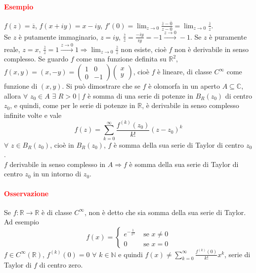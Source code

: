 \documentclass{article}
\newcommand{\R}{\mathbb{R}}
\newcommand{\C}{\mathbb{C}}
\newcommand{\N}{\mathbb{N}}
\begin{document}
\paragraph{\textcolor{red}{Esempio}}
$f(z)=\overline{z}$, $f(x+iy)=x-iy$, $f'(0)=\lim_{z \rightarrow 0} \frac{\overline{z}-\overline{0}}{z-0}=\lim_{z\rightarrow0}\frac{\overline{z}}{z}$.\\
Se $z$ è putamente immaginario, $z=iy$, $\frac{\overline{z}}{z}=\frac{-iy}{iy}=-1\xrightarrow{z \rightarrow 0}-1$. Se $z$ è puramente reale, $z=x$, $\frac{\overline{z}}{z}=1\xrightarrow{z \rightarrow 0}1 \Rightarrow \lim_{z\rightarrow0}\frac{\overline{z}}{z}$ non esiste, cioè $f$ non è derivabile in senso complesso. Se guardo $f$ come una funzione definita su $\R^2$, $f(x,y)=(x,-y)=\begin{pmatrix}
1 & 0 \\
0 & -1 
\end{pmatrix} \begin{pmatrix}
x\\
y
\end{pmatrix}$, cioè $f$ è lineare, di classe $C^\infty$ come funzione di $(x,y)$.
Si può dimostrare che se $f$ è olomorfa in un aperto $A\subseteq \C$, allora $\forall\,\, z_0 \in A \,\,\exists\,\, R>0\mid f$ è somma di una serie di potenze in $B_R(z_0)$ di centro $z_0$, e quindi, come per le serie di potenze in $\R$, è derivabile in senso complesso infinite volte e vale
\begin{equation*}
    f(z)=\sum_{k=0}^{\infty}\frac{f^{(k)}(z_0)}{k!}(z-z_0)^k
\end{equation*}
$\forall \,\, z \in B_R(z_0)$, cioè in $B_R(z_0)$, $f$ è somma della sua serie di Taylor di centro $z_0$.\\
$f$ derivabile in senso complesso in $A \Rightarrow f$ è somma della sua serie di Taylor di centro $z_0$ in un intorno di $z_0$. 

\paragraph{\textcolor{red}{Osservazione}}
Se $f:\R\rightarrow\R$ è di classe $C^\infty$, non è detto che sia somma della sua serie di Taylor.\\
Ad esempio
\begin{equation*}
    f(x)=\begin{cases}
        e^{-\frac{1}{x^2}}&\text{  se  }  x \neq 0 \\
        0 &\text{  se  } x =0
    \end{cases}
\end{equation*}
$f\in C^\infty(\R)$, $f^{(k)}(0)=0\,\,\forall\,\, k\in \N$ e quindi $f(x)\neq \sum_{k=0}^{\infty}\frac{f^{(k)}(0)}{k!}x^k$, serie di Taylor di $f$ di centro zero.
\end{document}
